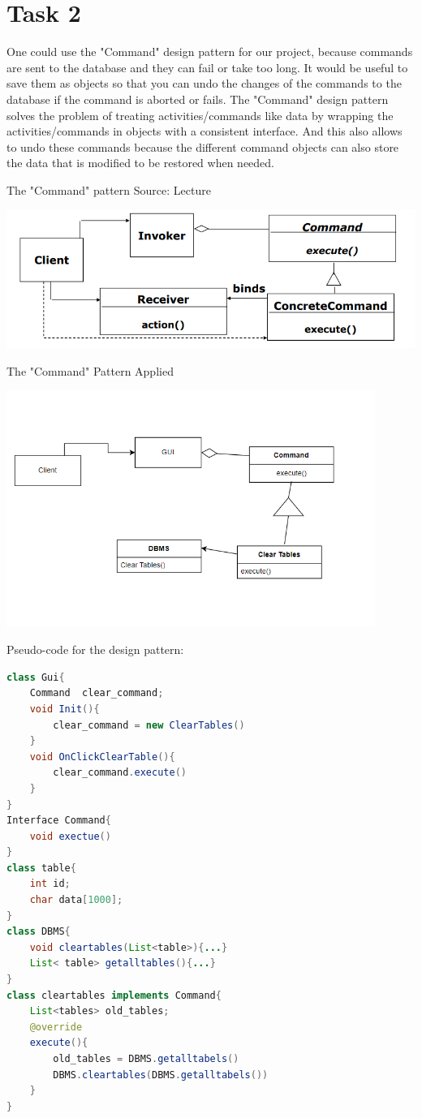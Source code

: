 \chapter{Task 2}
\begin{parlist}
   \item One could use the "Command" design pattern for our project, because commands are sent to the database and they can fail or take too long. It would be useful to save them as objects so that you can undo the changes of the commands to the database if the command is aborted or fails. The "Command" design pattern solves the problem of treating activities/commands like data by wrapping the activities/commands in objects with a consistent interface. And this also allows to undo these commands because the different command objects can also store the data that is modified to be restored when needed.

\item The "Command" pattern Source: Lecture
  \begin{center}
   \includegraphics[width=\textwidth]{Immagini/b}
  \end{center}
   \item The "Command" Pattern Applied
     \begin{center}
   \includegraphics[width=0.9\textwidth]{Immagini/a}
  \end{center}
   \item Pseudo-code for the design pattern: 
\begin{lstlisting}[language=java, frame=trBL]
class Gui{
	Command  clear_command; 
	void Init(){
		clear_command = new ClearTables()
	}
	void OnClickClearTable(){
		clear_command.execute()
	}
}
Interface Command{
	void exectue()
}
class table{
	int id;
	char data[1000];
}
class DBMS{
	void cleartables(List<table>){...}
	List< table> getalltables(){...}
}
class cleartables implements Command{
	List<tables> old_tables;
	@override
	execute(){
		old_tables = DBMS.getalltabels()
		DBMS.cleartables(DBMS.getalltabels())
	}
}
\end{lstlisting}
\end{parlist}
